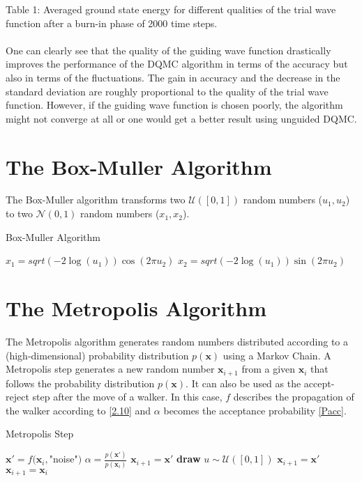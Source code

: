 \documentclass [12pt]{report}
\begin{document}
Table 1: Averaged ground state energy for different qualities of the trial wave function after a burn-in phase of 2000 time steps.\\
\\
One can clearly see that the quality of the guiding wave function drastically improves the performance of the DQMC algorithm in terms of the accuracy but also in terms of the fluctuations. The gain in accuracy and the decrease in the standard deviation are roughly proportional to the quality of the trial wave function. However, if the guiding wave function is chosen poorly, the algorithm might not converge at all or one would get a better result using unguided DQMC.

\begin{appendices}
\chapter{The Box-Muller Algorithm} \label{appendixA}
The Box-Muller algorithm transforms two $\mathcal{U}([0,1])$ random numbers ($u_1, u_2$) to two $\mathcal{N}(0,1)$ random numbers ($x_1, x_2$).

\begin{algorithm}
\caption{Box-Muller Algorithm}\label{box-muller}
\begin{algorithmic}[1]
\State $x_1 = sqrt(-2\log(u_1))\cos(2\pi u_2)$
\State $x_2 = sqrt(-2\log(u_1))\sin(2\pi u_2)$
\EndProcedure
\end{algorithmic}
\end{algorithm}

\chapter{The Metropolis Algorithm} \label{appendixB}
The Metropolis algorithm generates random numbers distributed according to a (high-dimensional) probability distribution $p(\bm{x})$ using a Markov Chain. A Metropolis step generates a new random number $\bm{x}_{i+1}$ from a given $\bm{x}_i$ that follows the probability distribution $p(\bm{x})$. It can also be used as the accept-reject step after the move of a walker. In this case, $f$ describes the propagation of the walker according to \eqref{2.10} and $\alpha$ becomes the acceptance probability \eqref{Pacc}.

\begin{algorithm}
\caption{Metropolis Step}\label{metropolis}
\begin{algorithmic}[1]
\State $\bm{x}' = f(\bm{x}_i,$"noise"$)$ 
\State $\alpha = \frac{p(\bm{x}')}{p(\bm{x}_i)}$
	\State $\bm{x}_{i+1} = \bm{x}'$ 
\Else
	\State \textbf{draw} $u \sim \mathcal{U}([0,1])$
		\State $\bm{x}_{i+1} = \bm{x}'$ 
	\Else
		\State $\bm{x}_{i+1} = \bm{x}_i$ 
	\EndIf
\EndIf 
\EndProcedure
\end{algorithmic}
\end{algorithm}


\end{appendices}
\end{document}
